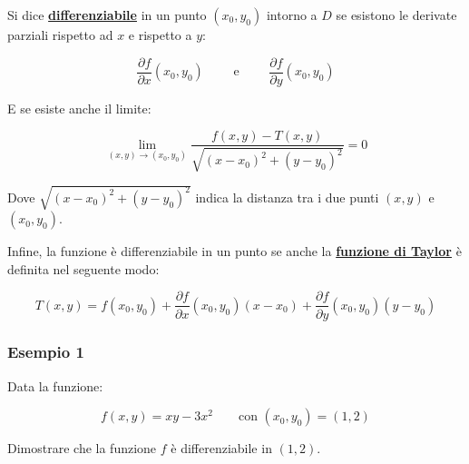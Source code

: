 \documentclass[a4paper]{article}
\begin{document}
	\noindent
	Si dice \textcolor{Red3}{\textbf{\underline{differenziabile}}} in un punto $\left(x_{0}, y_{0}\right)$ intorno a $D$ se esistono le derivate parziali rispetto ad $x$ e rispetto a $y$:
	
	\begin{equation*}
		\dfrac{\partial f}{\partial x}\left(x_{0}, y_{0}\right) \hspace{2em} \text{ e } \hspace{2em} \dfrac{\partial f}{\partial y}\left(x_{0}, y_{0}\right)
	\end{equation*}

	\noindent
	E se esiste anche il limite:
	
	\begin{equation*}
		\lim_{\left(x,y\right) \rightarrow \left(x_{0}, y_{0}\right)} \dfrac{f\left(x,y\right) - T\left(x,y\right)}{\sqrt{\left(x-x_{0}\right)^{2} + \left(y-y_{0}\right)^{2}}} = 0
	\end{equation*}

	\noindent
	Dove $\sqrt{\left(x-x_{0}\right)^{2} + \left(y-y_{0}\right)^{2}}$ indica la distanza tra i due punti $\left(x,y\right)$ e $\left(x_{0}, y_{0}\right)$.\newline
	
	\noindent
	Infine, la funzione è differenziabile in un punto se anche la \textcolor{Red3}{\textbf{\underline{funzione di Taylor}}} è definita nel seguente modo:
	
	\begin{equation*}
		T\left(x,y\right) = f\left(x_{0}, y_{0}\right) + \dfrac{\partial f}{\partial x}\left(x_{0}, y_{0}\right)\left(x-x_{0}\right) + \dfrac{\partial f}{\partial y}\left(x_{0}, y_{0}\right)\left(y-y_{0}\right)
	\end{equation*}

	\newpage

	\subsubsection[Esempio 1]{\textcolor{Green4}{Esempio 1}}
	
	Data la funzione:
	
	\begin{equation*}
		f\left(x,y\right) = xy - 3x^{2} \hspace{2em} \text{con } \left(x_{0},y_{0}\right) = \left(1,2\right)
	\end{equation*}

	\noindent
	Dimostrare che la funzione $f$ è differenziabile in $\left(1,2\right)$.\newline
	
\end{document}
